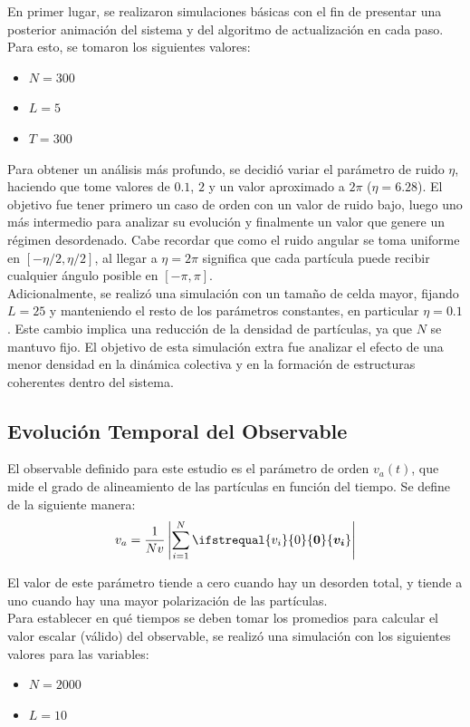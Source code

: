 \documentclass[12pt,a4paper]{article}
\renewcommand\vec[1]{\ifstrequal{#1}{0}{\ensuremath{\mathbf{0}}}{\ensuremath{\boldsymbol{#1}}}}
\begin{document}
En primer lugar, se realizaron simulaciones básicas con el fin de presentar una posterior animación del sistema y del algoritmo de actualización en cada paso. Para esto, se tomaron los siguientes valores:
\begin{itemize}
    \item $N = 300$
    \item $L = 5$
    \item $T = 300$
\end{itemize}

Para obtener un análisis más profundo, se decidió variar el parámetro de ruido $\eta$, haciendo que tome valores de $0.1$, $2$ y un valor aproximado a $2\pi$ ($\eta=6.28$). El objetivo fue tener primero un caso de orden con un valor de ruido bajo, luego uno más intermedio para analizar su evolución y finalmente un valor que genere un régimen desordenado. Cabe recordar que como el ruido angular se toma uniforme en $[-\eta/2,\eta/2]$, al llegar a $\eta=2\pi$ significa que cada partícula puede recibir cualquier ángulo posible en $[-\pi,\pi]$.\\

Adicionalmente, se realizó una simulación con un tamaño de celda mayor, fijando $L=25$ y manteniendo el resto de los parámetros constantes, en particular $\eta=0.1$. Este cambio implica una reducción de la densidad de partículas, ya que $N$ se mantuvo fijo. El objetivo de esta simulación extra fue analizar el efecto de una menor densidad en la dinámica colectiva y en la formación de estructuras coherentes dentro del sistema.

\subsection{Evolución Temporal del Observable}
\label{evolucion-temporal-del-observable}

El observable definido para este estudio es el parámetro de orden $v_a(t)$, que mide el grado de alineamiento de las partículas en función del tiempo. Se define de la siguiente manera:
\begin{equation}
    v_a = \frac{1}{Nv} \left|\sum_{i=1}^{N} \vec{v_i} \right|
\end{equation}

El valor de este parámetro tiende a cero cuando hay un desorden total, y tiende a uno cuando hay una mayor polarización de las partículas.\\

Para establecer en qué tiempos se deben tomar los promedios para calcular el valor escalar (válido) del observable, se realizó una simulación con los siguientes valores para las variables:
\begin{itemize}
    \item $N=2000$
    \item $L=10$
\end{itemize}
\end{document}

